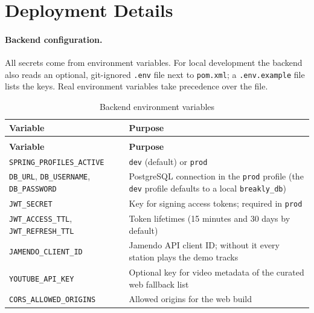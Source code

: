\section{Deployment Details}
\label{sec:deployment-details}

\paragraph{Backend configuration.}
All secrets come from environment variables. For local development the
backend also reads an optional, git-ignored \texttt{.env} file next to
\texttt{pom.xml}; a \texttt{.env.example} file lists the keys. Real
environment variables take precedence over the file.

\begingroup
\small
\renewcommand{\arraystretch}{1.2}
\begin{longtable}{|>{\raggedright\arraybackslash}p{4.6cm}|>{\raggedright\arraybackslash}p{9.6cm}|}
\caption{Backend environment variables}\label{tab:env-vars}\\ \hline
\textbf{Variable} & \textbf{Purpose} \\ \hline
\endfirsthead
\multicolumn{2}{c}{{\bfseries \tablename\ \thetable{} -- continued from previous page}} \\ \hline
\textbf{Variable} & \textbf{Purpose} \\ \hline
\endhead
\texttt{SPRING\_PROFILES\_ACTIVE} & \texttt{dev} (default) or \texttt{prod} \\ \hline
\texttt{DB\_URL}, \texttt{DB\_USERNAME}, \texttt{DB\_PASSWORD} & PostgreSQL connection in the \texttt{prod} profile (the \texttt{dev} profile defaults to a local \texttt{breakly\_db}) \\ \hline
\texttt{JWT\_SECRET} & Key for signing access tokens; required in \texttt{prod} \\ \hline
\texttt{JWT\_ACCESS\_TTL}, \texttt{JWT\_REFRESH\_TTL} & Token lifetimes (15 minutes and 30 days by default) \\ \hline
\texttt{JAMENDO\_CLIENT\_ID} & Jamendo API client ID; without it every station plays the demo tracks \\ \hline
\texttt{YOUTUBE\_API\_KEY} & Optional key for video metadata of the curated web fallback list \\ \hline
\texttt{CORS\_ALLOWED\_ORIGINS} & Allowed origins for the web build \\ \hline
\end{longtable}
\endgroup

